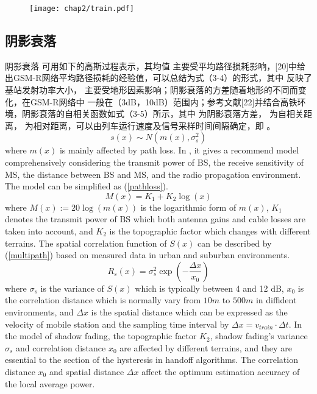 \begin{figure}[!htp]
\centering
    \texttt{[image: chap2/train.pdf]}
\end{figure}

\subsection{阴影衰落}
\label{sec:shadow}

阴影衰落 可用如下的高斯过程表示，其均值 主要受平均路径损耗影响，[20]中给出GSM-R网络平均路径损耗的经验值，可以总结为式（3-4）的形式，其中 反映了基站发射功率大小， 主要受地形因素影响；阴影衰落的方差随着地形的不同而变化，在GSM-R网络中 一般在（3dB，10dB）范围内；参考文献[22]并结合高铁环境，阴影衰落的自相关函数如式（3-5）所示，其中 为阴影衰落方差， 为自相关距离， 为相对距离，可以由列车运行速度及信号采样时间间隔确定，即 。
\begin{equation}
    s(x) \sim N\left( m(x),\sigma_s^2 \right)
\label{shadow}
\end{equation}
where $m(x)$ is mainly affected by path loss. In \cite{sarkar2003survey}, it gives a recommend model comprehensively considering the transmit power of BS, the receive sensitivity of MS, the distance between BS and MS, and the radio propagation environment. The model can be simplified as (\ref{pathloss}).
\begin{equation}
    M(x)= K_1+K_2\log(x)
\label{pathloss}
\end{equation}
where $M(x):=20\log(m(x))$ is the logarithmic form of $m(x)$, $K_1$ denotes the transmit power of BS which both antenna gains and cable losses are taken into account, and $K_2$ is the topographic factor which changes with different terrains\cite{hata1980empirical}\cite{medeisis2000use}. The spatial correlation function of $S(x)$ can be described by (\ref{multipath}) based on measured data in urban and suburban environments\cite{gudmundson1991correlation}.
\begin{equation}
    R_{s}(x) = \sigma_{s}^2\exp\left(-\frac{\Delta x}{x_0}\right)
\label{multipath}
\end{equation}
where $\sigma_s$ is the variance of $S(x)$ which is typically between 4 and 12 dB, $x_0$ is the correlation distance which is normally vary from $10 m$ to $500 m$ in diffident environments\cite{tepedelenlio?lu2001estimation}, and $\Delta x$ is the spatial distance which can be expressed as the velocity of mobile station and the sampling time interval by $\Delta x = v_{train}\cdot\Delta t$. In the model of shadow fading, the topographic factor $K_2$, shadow fading's variance $\sigma_s$ and correlation distance $x_0$ are affected by different terrains, and they are essential to the section of the hysteresis in handoff algorithms. The correlation distance $x_0$ and spatial distance $\Delta x$ affect the optimum estimation accuracy of the local average power.

